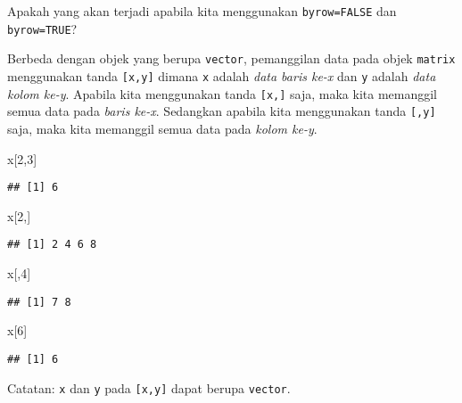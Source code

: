 \documentclass[
]{book}
\newenvironment{Shaded}{\begin{snugshade}}{\end{snugshade}}
\newcommand{\DecValTok}[1]{\textcolor[rgb]{0.00,0.00,0.81}{#1}}
\newcommand{\NormalTok}[1]{#1}
\begin{document}
Apakah yang akan terjadi apabila kita menggunakan \texttt{byrow=FALSE} dan \texttt{byrow=TRUE}?

Berbeda dengan objek yang berupa \texttt{vector}, pemanggilan data pada objek \texttt{matrix} menggunakan tanda \texttt{{[}x,y{]}} dimana \texttt{x} adalah \emph{data baris ke-x} dan \texttt{y} adalah \emph{data kolom ke-y}. Apabila kita menggunakan tanda \texttt{{[}x,{]}} saja, maka kita memanggil semua data pada \emph{baris ke-x}. Sedangkan apabila kita menggunakan tanda \texttt{{[},y{]}} saja, maka kita memanggil semua data pada \emph{kolom ke-y}.

\begin{Shaded}
\begin{Highlighting}[]
\NormalTok{x[}\DecValTok{2}\NormalTok{,}\DecValTok{3}\NormalTok{]}
\end{Highlighting}
\end{Shaded}

\begin{verbatim}
## [1] 6
\end{verbatim}

\begin{Shaded}
\begin{Highlighting}[]
\NormalTok{x[}\DecValTok{2}\NormalTok{,]}
\end{Highlighting}
\end{Shaded}

\begin{verbatim}
## [1] 2 4 6 8
\end{verbatim}

\begin{Shaded}
\begin{Highlighting}[]
\NormalTok{x[,}\DecValTok{4}\NormalTok{]}
\end{Highlighting}
\end{Shaded}

\begin{verbatim}
## [1] 7 8
\end{verbatim}

\begin{Shaded}
\begin{Highlighting}[]
\NormalTok{x[}\DecValTok{6}\NormalTok{]}
\end{Highlighting}
\end{Shaded}

\begin{verbatim}
## [1] 6
\end{verbatim}

Catatan: \texttt{x} dan \texttt{y} pada \texttt{{[}x,y{]}} dapat berupa \texttt{vector}.
\end{document}
